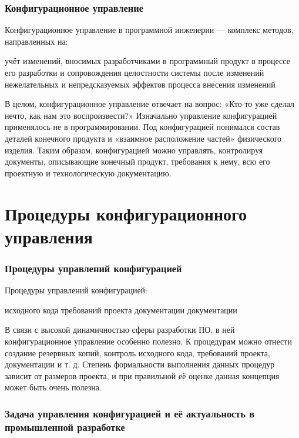 \documentclass{../industrial-development}
\begin{document}
\begin{frame} \frametitle{Конфигурационное управление}
 \begin{block}{Конфигурационное управление в программной инженерии — комплекс методов, направленных на:}
  \begin{itemize}
 учёт изменений, вносимых разработчиками в программный продукт в процессе его разработки и сопровождения 
 целостности системы после изменений
 нежелательных и непредсказуемых эффектов
 процесса внесения изменений
  \end{itemize}
	\end{block}
\end{frame}

\lecturenotes
В целом, конфигурационное управление отвечает на вопрос: «Кто-то уже сделал нечто, как нам это воспроизвести?»
Изначально управление конфигурацией применялось не в программировании. Под конфигурацией понимался состав деталей конечного продукта и «взаимное расположение частей» физического изделия. Таким образом, конфигурацией можно управлять, контролируя документы, описывающие конечный продукт, требования к нему, всю его проектную и технологическую документацию.

\section{Процедуры конфигурационного управления}
\begin{frame} \frametitle{Процедуры управлений конфигурацией}
  \begin{block}{Процедуры управлений конфигурацией:}
  \begin{itemize}
 исходного кода
 требований проекта
 документации
 документации 
  \end{itemize}
	\end{block}
	\end{frame}

\lecturenotes
В связи с высокой динамичностью сферы разработки ПО, в ней конфигурационное управление особенно полезно. К процедурам можно отнести создание резервных копий, контроль исходного кода, требований проекта, документации и т. д. Степень формальности выполнения данных процедур зависит от размеров проекта, и при правильной её оценке данная концепция может быть очень полезна.

\begin{frame} \frametitle{Задача управления конфигурацией и её актуальность в промышленной разработке}
  
\end{frame}
\end{document}
